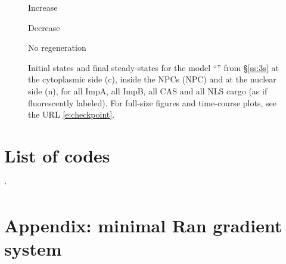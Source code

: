 \documentclass[12pt,notitlepage]{article}
\def\[#1\]{\begin{align}#1\end{align}}
\begin{document}
\begin{figure}[!h]
	\begin{minipage}{0.32\textwidth}
		\centering
		Increase  \\[0.5\baselineskip]
		\newcommand\fig[1]{\texttt{[image: \\figpath/d\_HighImpA/\#1]}}
		\figures
	\end{minipage}
	\hfill
	\begin{minipage}{0.32\textwidth}
		\centering
		Decrease  \\[0.5\baselineskip]
		\newcommand\fig[1]{\texttt{[image: \\figpath/d\_LowImpA/\#1]}}
		\figures
	\end{minipage}
	\hfill
	\begin{minipage}{0.32\textwidth}
		\centering
		No  regeneration \\[0.5\baselineskip]
		\newcommand\fig[1]{\texttt{[image: \\figpath/e\_NoEnergy/\#1]}}
		\figures
	\end{minipage}
	
	\vspace{\baselineskip}
		
	\caption{%
		Initial states and final steady-states for the model 
		``'' from \S\ref{ss:3s}
		at the cytoplasmic side (c),
		inside the NPCs (NPC)
		and 
		at the nuclear side (n),
		for 
		all ImpA, all ImpB, all CAS and all NLS cargo
		(as if fluorescently labeled).
		For full-size figures and time-course plots, see the URL \eqref{e:checkpoint}.
	}
	\label{f:app:3s-plot2-ss}
\end{figure}





%




\clearpage

\renewcommand*{\bibfont}{\normalfont\small}
\printbibliography %


\section*{List of codes}

\begin{center}
\SHOWCODES
\end{center}



`\clearpage

\section{Appendix: minimal Ran gradient system} \label{s:app:gsr-ran}






%
\end{document}
